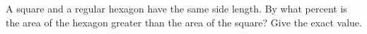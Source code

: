A square and a regular hexagon have the same side length. By what percent is the area of the hexagon greater than the area of the square? Give the exact value.
